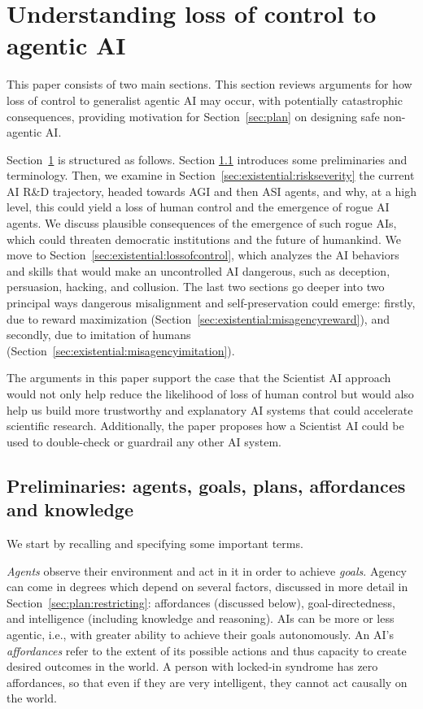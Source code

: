 \section{Understanding loss of control to agentic AI}
\label{sec:existential}

This paper consists of two main sections. This section reviews arguments for how loss of control to generalist agentic AI may occur, with potentially catastrophic consequences, providing motivation for Section~\ref{sec:plan} on designing safe non-agentic AI.

Section~\ref{sec:existential} is structured as follows. Section \ref{sec:existential:preliminaries} introduces some preliminaries and terminology. Then, we examine in Section~\ref{sec:existential:riskseverity} the current AI R\&D trajectory, headed towards AGI and then ASI agents, and why, at a high level, this could yield a loss of human control and the emergence of rogue AI agents. We discuss plausible consequences of the emergence of such rogue AIs, which could threaten democratic institutions and the future of humankind. We move to Section~\ref{sec:existential:lossofcontrol}, which analyzes the AI behaviors and skills that would make an uncontrolled AI dangerous, such as deception, persuasion, hacking, and collusion. The last two sections go deeper into two principal ways dangerous misalignment and self-preservation could emerge: firstly, due to reward maximization (Section~\ref{sec:existential:misagencyreward}), and secondly, due to imitation of humans (Section~\ref{sec:existential:misagencyimitation}).

The arguments in this paper support the case that the Scientist AI approach would not only help reduce the likelihood of loss of human control but would also help us build more trustworthy and explanatory AI systems that could accelerate scientific research. Additionally, the paper proposes how a Scientist AI could be used to double-check or guardrail any other AI system.

\subsection{Preliminaries: agents, goals, plans, affordances and knowledge}
\label{sec:existential:preliminaries}

We start by recalling and specifying some important terms.

\textit{Agents} observe their environment and act in it in order to achieve \textit{goals}. Agency can come in degrees which depend on several factors, discussed in more detail in Section~\ref{sec:plan:restricting}: affordances (discussed below), goal-directedness, and intelligence (including knowledge and reasoning). AIs can be more or less agentic, i.e., with greater ability to achieve their goals autonomously. An AI's \textit{affordances} refer to the extent of its possible actions and thus capacity to create desired outcomes in the world. A person with locked-in syndrome has zero affordances, so that even if they are very intelligent, they cannot act causally on the world.

